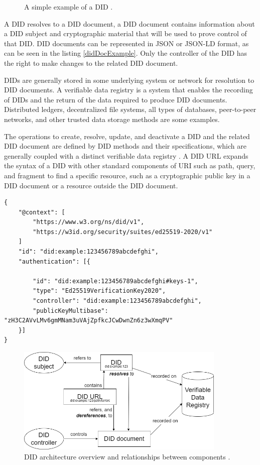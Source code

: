 \begin{figure}[h!]
    \centering
    
    \caption{A simple example of a DID \cite{didW3C}.}
    \label{didExample}
\end{figure}

A DID resolves to a DID document, a DID document contains information about a DID subject and cryptographic material that will be used to prove control of that DID. DID documents can be represented in JSON \cite{json-rfc3986} or JSON-LD \cite{json-ld} format, as can be seen in the listing \ref{didDocExample}. Only the controller of the DID has the right to make changes to the related DID document. 

DIDs are generally stored in some underlying system or network for resolution to DID documents. A verifiable data registry is a system that enables the recording of DIDs and the return of the data required to produce DID documents. Distributed ledgers, decentralized file systems, all types of databases, peer-to-peer networks, and other trusted data storage methods are some examples.

The operations to create, resolve, update, and deactivate a DID and the related DID document are defined by DID methods and their specifications, which are generally coupled with a distinct verifiable data registry \cite{didW3C}. 
A DID URL expands the syntax of a DID with other standard components of URI such as path, query, and fragment to find a specific resource, such as a cryptographic public key in a DID document or a resource outside the DID document.

\begin{lstlisting}[caption={Example of a simple DID document from \cite{didW3C}.},captionpos=b,style=json, label={didDocExample},frame=single]
{
    "@context": [
        "https://www.w3.org/ns/did/v1",
        "https://w3id.org/security/suites/ed25519-2020/v1"
    ]
    "id": "did:example:123456789abcdefghi",
    "authentication": [{

        "id": "did:example:123456789abcdefghi#keys-1",
        "type": "Ed25519VerificationKey2020",
        "controller": "did:example:123456789abcdefghi",
        "publicKeyMultibase": "zH3C2AVvLMv6gmMNam3uVAjZpfkcJCwDwnZn6z3wXmqPV"
    }]
}
\end{lstlisting}

\begin{figure}[h!]
    \centering
    \includegraphics[width=10cm]{./chapters/images/did-overview.png}
    \caption{DID architecture overview and relationships between components \cite{didW3C}.}
    \label{didOverview}
\end{figure}

